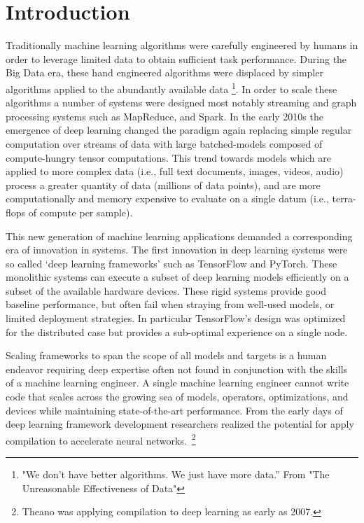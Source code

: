 \chapter{Introduction}
\label{ch:intro}

Traditionally machine learning algorithms were carefully engineered by humans
  in order to leverage limited data to obtain sufficient task performance.
During the Big Data era, these hand engineered algorithms were displaced by
  simpler algorithms applied to the abundantly available data
  \footnote{"We don’t have better algorithms. We just have more data.” From "The Unreasonable Effectiveness of Data"}.
In order to scale these algorithms a number of systems were
  designed most notably streaming and graph processing systems such as MapReduce, and Spark.
In the early 2010s the emergence of deep learning changed the paradigm again
  replacing simple regular computation over streams of data with large batched-models
  composed of compute-hungry tensor computations.
This trend towards models which are applied to more complex data (i.e., full text documents, images, videos, audio)
  process a greater quantity of data (millions of data points), and are more computationally and memory expensive
  to evaluate on a single datum (i.e., terra-flops of compute per sample).

This new generation of machine learning applications demanded a corresponding era of
  innovation in systems.
The first innovation in deep learning systems were so called
  ‘deep learning frameworks’ such as TensorFlow and PyTorch.
These monolithic systems can execute a subset of deep learning models
  efficiently on a subset of the available hardware devices.
These rigid systems provide good baseline performance, but often fail
  when straying from well-used models, or limited deployment strategies.
In particular TensorFlow's design was optimized for the distributed case
  but provides a sub-optimal experience on a single node.

Scaling frameworks to span the scope of all models and targets is a human endeavor
  requiring deep expertise often not found in conjunction with the skills of a
  machine learning engineer.
A single machine learning engineer cannot write code that scales across the growing
  sea of models, operators, optimizations, and devices while maintaining state-of-the-art
  performance.
From the early days of deep learning framework development researchers realized the
  potential for apply compilation to accelerate neural networks.~\footnote{Theano was applying
  compilation to deep learning as early as 2007.}

